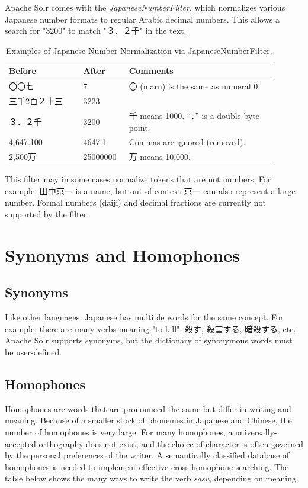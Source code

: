 \documentclass[11pt]{article}
\begin{document}
Apache Solr comes with the \textit{JapaneseNumberFilter}, which normalizes various Japanese number formats to regular Arabic decimal numbers. This allows a search for "3200" to match "３．２千" in the text.

\begin{table}[h!]
    \centering
    \caption{Examples of Japanese Number Normalization via JapaneseNumberFilter.}
    \begin{tabular}{p{0.25\linewidth} p{0.15\linewidth} p{0.5\linewidth}}
    \toprule
    \textbf{Before} & \textbf{After} & \textbf{Comments} \\
    \midrule
    〇〇七 & 7 & 〇 (maru) is the same as numeral 0. \\
    三千2百２十三 & 3223 & \\
    ３．２千 & 3200 & 千 means 1000. “．” is a double-byte point. \\
    4,647.100 & 4647.1 & Commas are ignored (removed). \\
    2,500万 & 25000000 & 万 means 10,000. \\
    \bottomrule
    \end{tabular}
    \label{tab:number_normalization}
\end{table}

This filter may in some cases normalize tokens that are not numbers. For example, 田中京一 is a name, but out of context 京一 can also represent a large number. Formal numbers (daiji) and decimal fractions are currently not supported by the filter.

\section{Synonyms and Homophones}
\subsection{Synonyms}
Like other languages, Japanese has multiple words for the same concept. For example, there are many verbs meaning "to kill": 殺す, 殺害する, 暗殺する, etc. Apache Solr supports synonyms, but the dictionary of synonymous words must be user-defined.

\subsection{Homophones}
Homophones are words that are pronounced the same but differ in writing and meaning. Because of a smaller stock of phonemes in Japanese and Chinese, the number of homophones is very large. For many homophones, a universally-accepted orthography does not exist, and the choice of character is often governed by the personal preferences of the writer. A semantically classified database of homophones is needed to implement effective cross-homophone searching. The table below shows the many ways to write the verb \textit{sasu}, depending on meaning.
\end{document}
